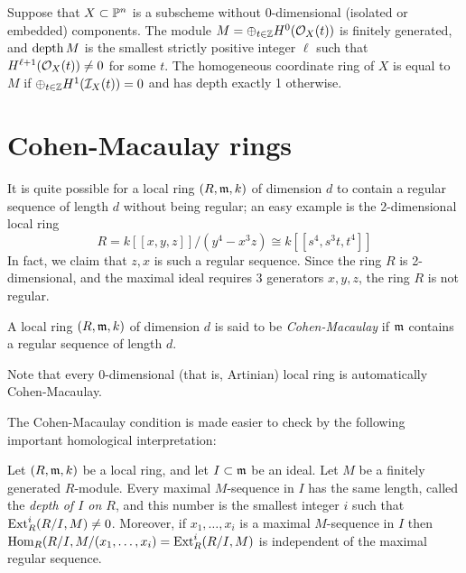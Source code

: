 \begin{theorem}\label{Auslander-Buchsbaum} Suppose that $X\subset \PP^{n}$ is a  subscheme without 0-dimensional (isolated or embedded) components. The module $M = \oplus_{t\in \ZZ}H^{0}(\cO_{X}(t))$
is finitely generated, and $\depth M$ is the smallest strictly positive integer $\ell$ such that 
$H^{\ell+1}(\cO_{X}(t)) \neq 0$  for some $t$. The homogeneous coordinate ring of $X$ is equal to $M$ if
$\oplus_{t\in \ZZ}H^{1}(\cI_{X}(t)) = 0$ and has depth exactly 1 otherwise.
\end{theorem}



 \section{Cohen-Macaulay rings}

 It is quite possible for a local ring $(R,\gm, k)$ of dimension $d$ to contain a regular sequence of length $d$
 without being regular; an easy example is the 2-dimensional local ring
 $$
 R = k[[x,y, z]]/(y^{4}-x^{3}z) \cong k[[s^{4}, s^{3}t, t^{4}]]
 $$
In fact, we claim that $z,x$ is such a regular sequence. Since the ring $R$ is 2-dimensional, and the maximal ideal requires 3 generators $x,y,z$, the ring $R$ is not regular. 

\begin{definition}
A local ring $(R,\gm,k)$ of dimension $d$ is said to be \emph{Cohen-Macaulay}  if $\gm$ contains a regular sequence of length $d$.
\end{definition}
 Note that every 0-dimensional (that is, Artinian) local ring is automatically Cohen-Macaulay.
 
The Cohen-Macaulay condition is made easier to check by the following important homological interpretation:

\begin{theorem}\label{depth}
Let $(R,\gm, k)$ be a local ring, and let $I\subset \gm$ be an ideal. 
Let $M$ be a finitely generated 
 $R$-module. Every maximal $M$-sequence in $I$ has the same length, called the \emph{depth of $I$ on $R$}, and this number is the smallest integer $i$ such that
 $\Ext^{i}_{R}(R/I, M)\neq 0$. Moreover, if $x_{1}, \dots, x_{i}$ is a maximal $M$-sequence
 in $I$ then $\Hom_{R}(R/I, M/(x_{1}, \dots, x_{i})= \Ext^{i}_{R}(R/I, M)$ is independent of the maximal regular sequence.
\end{theorem}
 
